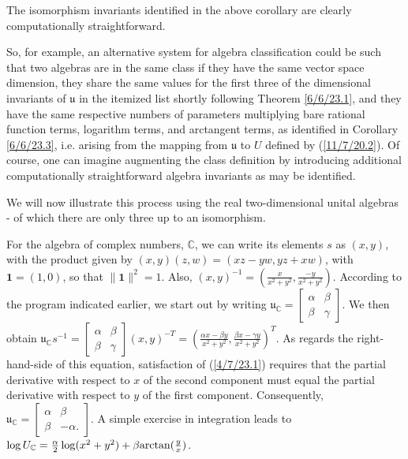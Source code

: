 \documentclass{amsart}
\numberwithin{equation}{section}
\theoremstyle{definition}
\numberwithin{theorem}{section}
\begin{document}
The isomorphism invariants identified in the above corollary are clearly computationally straightforward.

So, for example, an alternative system for algebra classification could be such that two algebras are in the same class if they have the same vector space dimension, they share the same values for the first three of the dimensional invariants of $\mathfrak{u}$ in the itemized list shortly following Theorem \ref{6/6/23.1}, and they have the same respective numbers of parameters multiplying bare rational function terms, logarithm terms, and arctangent terms, as identified in Corollary \ref{6/6/23.3}, i.e. arising from the mapping from $\mathfrak{u}$ to $ U$ defined by (\ref{11/7/20.2}).  
Of course, one can imagine augmenting the class definition by introducing additional computationally straightforward algebra invariants as may be identified.  

We will now illustrate this process using the real two-dimensional unital algebras - of which there are only three up to an isomorphism.

For the algebra of complex numbers, $\mathbb{C}$, we can write its elements $s$ as $(x,y)$, with the product given by $(x,y)(z,w) = (xz-yw, yz+xw)$, with $\mathbf{1}=(1,0)$, so that $\|\mathbf{1}\|^2=1$.  Also, $(x,y)^{-1} = (\frac{x}{x^2+y^2},\frac{-y}{x^2+y^2})$.  According to the program indicated earlier, we start out by writing  $\mathfrak{u}_\mathbb{C} = \left[\begin{array}{ccc}
 \alpha & \beta   \\ 
 \beta & \gamma    
\end{array}\right]$.  We then obtain  $\mathfrak{u}_\mathbb{C}s^{-1} = \left[\begin{array}{ccc}
 \alpha & \beta   \\ 
 \beta & \gamma    
\end{array}\right](x,y)^{-T} = \left(\frac{\alpha x - \beta y}{x^2+y^2}, \frac{\beta x - \gamma y}{x^2+y^2}\right)^T$.  As regards the right-hand-side of this equation, satisfaction of (\ref{4/7/23.1}) requires that the partial derivative with respect to $x$ of the second component must equal the partial derivative with respect to $y$ of the first component.  Consequently, $\mathfrak{u}_{\mathbb{C}} = \left[\begin{array}{ccc}
 \alpha & \beta   \\ 
 \beta & -\alpha.    
\end{array}\right]$.  A simple exercise in integration leads to $\log  U_{\mathbb{C}} = \frac{\alpha}{2}\log(x^2+y^2) + \beta{\rm arctan}(\frac{y}{x})$.
\end{document}
